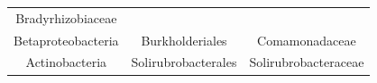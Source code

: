 \documentclass[]{article}
\begin{document}
\begin{longtable}[]{@{}ccc@{}}
\begin{minipage}[t]{0.30\columnwidth}
Bradyrhizobiaceae\strut
\end{minipage}\tabularnewline
\begin{minipage}[t]{0.28\columnwidth}\centering\strut
Betaproteobacteria\strut
\end{minipage} & \begin{minipage}[t]{0.30\columnwidth}\centering\strut
Burkholderiales\strut
\end{minipage} & \begin{minipage}[t]{0.30\columnwidth}\centering\strut
Comamonadaceae\strut
\end{minipage}\tabularnewline
\begin{minipage}[t]{0.28\columnwidth}\centering\strut
Actinobacteria\strut
\end{minipage} & \begin{minipage}[t]{0.30\columnwidth}\centering\strut
Solirubrobacterales\strut
\end{minipage} & \begin{minipage}[t]{0.30\columnwidth}\centering\strut
Solirubrobacteraceae\strut
\end{minipage}\tabularnewline
\bottomrule
\end{longtable}
\end{document}

